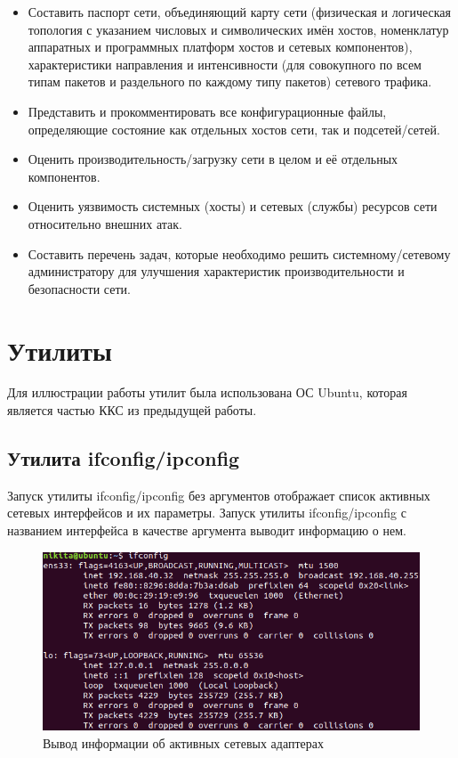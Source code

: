 \documentclass[14pt,a4paper,report]{report}
\begin{document}
\begin{itemize}
	\item Составить паспорт сети, объединяющий карту сети (физическая и логическая топология с указанием числовых и символических имён хостов, номенклатур аппаратных и программных платформ хостов и сетевых компонентов), характеристики направления и интенсивности (для совокупного по всем типам пакетов и раздельного по каждому типу пакетов) сетевого трафика.
	\item Представить и прокомментировать все конфигурационные файлы, определяющие состояние как отдельных хостов сети, так и подсетей/сетей.
	\item Оценить производительность/загрузку сети в целом и её отдельных компонентов.
	\item Оценить уязвимость системных (хосты) и сетевых (службы) ресурсов сети относительно внешних атак.
	\item Составить перечень задач, которые необходимо решить системному/сетевому администратору для улучшения характеристик производительности и безопасности сети.
\end{itemize}

\section{Утилиты}

Для иллюстрации работы утилит была использована ОС Ubuntu, которая является частью ККС из предыдущей работы.

\subsection{Утилита ifconfig/ipconfig}

Запуск утилиты ifconfig/ipconfig без аргументов отображает список активных сетевых интерфейсов и их параметры. Запуск утилиты ifconfig/ipconfig с названием интерфейса в качестве аргумента выводит информацию о нем.

\begin{figure}[h!]
	\centering
	\includegraphics[scale = 0.7]{images/0_1.png}
	\caption{Вывод информации об активных сетевых адаптерах}
	\label{image:0}
\end{figure}
\end{document}
